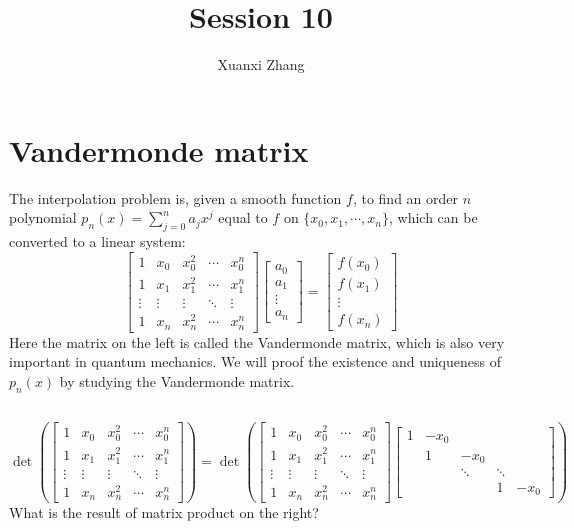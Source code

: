 \documentclass{article}%
\title{\huge Session 10\\
\normalsize}
\author{Xuanxi Zhang}
\begin{document}
\maketitle

\section{Vandermonde matrix}
The interpolation problem is, given a smooth function $f$, to find an order $n$ polynomial $p_n(x) = \sum_{j=0}^n a_j x^j$ equal to $f$ on $\{x_0, x_1, \cdots, x_n\}$, which can be converted to a linear system:
$$
\begin{bmatrix}
1 & x_0 & x_0^2 & \cdots & x_0^n\\
1 & x_1 & x_1^2 & \cdots & x_1^n\\
\vdots & \vdots & \vdots & \ddots & \vdots\\
1 & x_n & x_n^2 & \cdots & x_n^n
\end{bmatrix}
\begin{bmatrix}
a_0\\
a_1\\
\vdots\\
a_n
\end{bmatrix}=\begin{bmatrix}
f(x_0)\\
f(x_1)\\
\vdots\\
f(x_n)
\end{bmatrix}
$$
Here the matrix on the left is called the Vandermonde matrix, which is also very important in quantum mechanics. We will proof the existence and uniqueness of $p_n(x)$ by studying the Vandermonde matrix.
\subsection{}
$$
\det\left(\begin{bmatrix}
  1 & x_0 & x_0^2 & \cdots & x_0^n\\
1 & x_1 & x_1^2 & \cdots & x_1^n\\
\vdots & \vdots & \vdots & \ddots & \vdots\\
1 & x_n & x_n^2 & \cdots & x_n^n
\end{bmatrix}\right)=\det\left(\begin{bmatrix}
  1 & x_0 & x_0^2 & \cdots & x_0^n\\
1 & x_1 & x_1^2 & \cdots & x_1^n\\
\vdots & \vdots & \vdots & \ddots & \vdots\\
1 & x_n & x_n^2 & \cdots & x_n^n
\end{bmatrix}\begin{bmatrix}
  1&-x_0&&&\\ 
  &1&-x_0&&\\
  &&\ddots&\ddots&\\
  &&&1&-x_0
\end{bmatrix}\right)
$$
What is the result of matrix product on the right?
\end{document}
